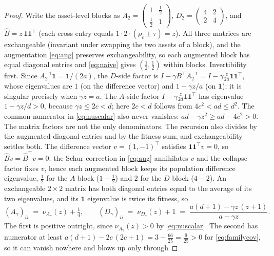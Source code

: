 \documentclass[11pt]{article}
\theoremstyle{remark}
\begin{document}
\begin{proof}
Write the asset-level blocks as $A_2 = \left(\begin{smallmatrix} 1 & \frac12
\\ \frac12 & 1 \end{smallmatrix}\right)$, $D_2 = \left(\begin{smallmatrix}
4 & 2 \\ 2 & 4\end{smallmatrix}\right)$, and $\widehat B = z\,
\mathbf{1}\mathbf{1}^\top$ (each cross entry equals
$1 \cdot 2 \cdot (\rho_c \pm \tau) = z$). All three matrices are
exchangeable (invariant under swapping the two assets of a block), and the
augmentation \eqref{eq:aug} preserves exchangeability, so each augmented
block has equal diagonal entries and \eqref{eq:naive} gives
$(\tfrac12,\tfrac12)$ within blocks. Invertibility first. Since
$A_2^{-1}\mathbf{1} = \mathbf{1}/(2a)$, the $D$-side factor is
$I - \gamma B^\top A_2^{-1} = I - \gamma\tfrac{z}{2a}
\mathbf{1}\mathbf{1}^\top$, whose eigenvalues are $1$ (on the difference
vector) and $1 - \gamma z/a$ (on $\mathbf{1}$); it is singular precisely
when $\gamma z = a$. The $A$-side factor
$I - \gamma\tfrac{z}{2d}\mathbf{1}\mathbf{1}^\top$ has eigenvalue
$1 - \gamma z/d > 0$, because $\gamma z \le 2c < d$; here $2c < d$ follows
from $4c^2 < ad \le d^2$. The common numerator in \eqref{eq:nuscalar} also
never vanishes: $ad - \gamma z^2 \ge ad - 4c^2 > 0$. The matrix factors are
not the only denominators. The recursion also divides by the augmented
diagonal entries and by the fitness sum, and exchangeability settles both.
The difference vector $v = (1, -1)^\top$ satisfies
$\mathbf{1}\mathbf{1}^\top v = 0$, so $\widehat B v = \widehat B^\top v =
0$: the Schur correction in \eqref{eq:aug} annihilates $v$ and the collapse
factor fixes $v$, hence each augmented block keeps its population
difference eigenvalue, $\tfrac12$ for the $A$ block ($1 - \tfrac12$) and
$2$ for the $D$ block ($4 - 2$). An exchangeable
$2 \times 2$ matrix has both diagonal entries equal to the average of its
two eigenvalues, and its $\mathbf 1$ eigenvalue is twice its fitness, so
\[
  (A_\gamma)_{ii} \;=\; \nu_{A_\gamma}(z) + \tfrac14,
  \qquad
  (D_\gamma)_{ii} \;=\; \nu_{D_\gamma}(z) + 1
  \;=\; \frac{a(d+1) - \gamma z\,(z+1)}{a - \gamma z}.
\]
The first is positive outright, since $\nu_{A_\gamma}(z) > 0$ by
\eqref{eq:nuscalar}. The second has numerator at least
$a(d+1) - 2c\,(2c+1) = 3 - \tfrac{66}{25} = \tfrac{9}{25} > 0$ for
\eqref{eq:familycov}, so it can vanish nowhere and blows up only through

\end{proof}
\end{document}
